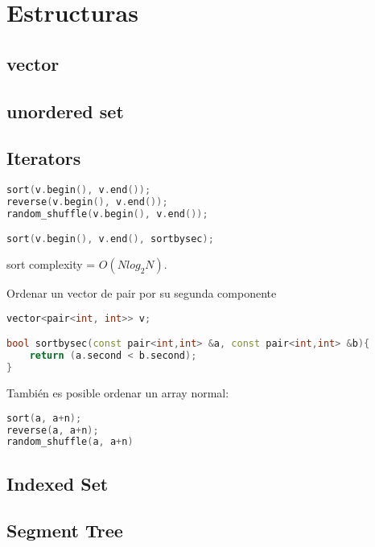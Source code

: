 \newpage
\section{Estructuras}

\subsection{vector}


\subsection{unordered set}


\subsection{Iterators}
\begin{lstlisting}[language=C++]
sort(v.begin(), v.end());
reverse(v.begin(), v.end());
random_shuffle(v.begin(), v.end());

sort(v.begin(), v.end(), sortbysec);
\end{lstlisting}

sort complexity = $O(N log_2 N)$.

Ordenar un vector de pair por su segunda componente
\begin{lstlisting}[language=C++]
vector<pair<int, int>> v;

bool sortbysec(const pair<int,int> &a, const pair<int,int> &b){
	return (a.second < b.second);
}
\end{lstlisting}

También es posible ordenar un array normal:
\begin{lstlisting}[language=C++]
sort(a, a+n);
reverse(a, a+n);
random_shuffle(a, a+n)
\end{lstlisting}

\subsection{Indexed Set}


\subsection{Segment Tree}

